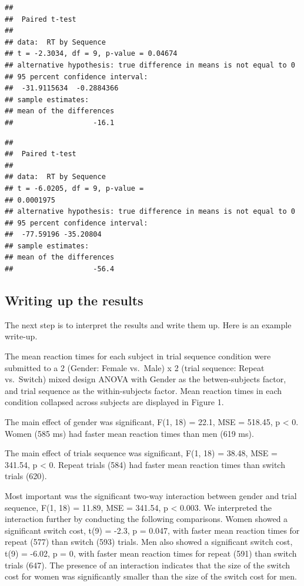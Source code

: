 \begin{verbatim}
## 
##  Paired t-test
## 
## data:  RT by Sequence
## t = -2.3034, df = 9, p-value = 0.04674
## alternative hypothesis: true difference in means is not equal to 0
## 95 percent confidence interval:
##  -31.9115634  -0.2884366
## sample estimates:
## mean of the differences 
##                   -16.1
\end{verbatim}

\begin{Shaded}
\begin{Highlighting}[]
\end{Highlighting}
\end{Shaded}

\begin{verbatim}
## 
##  Paired t-test
## 
## data:  RT by Sequence
## t = -6.0205, df = 9, p-value =
## 0.0001975
## alternative hypothesis: true difference in means is not equal to 0
## 95 percent confidence interval:
##  -77.59196 -35.20804
## sample estimates:
## mean of the differences 
##                   -56.4
\end{verbatim}

\subsection{Writing up the results}\label{writing-up-the-results}

The next step is to interpret the results and write them up. Here is an
example write-up.

The mean reaction times for each subject in trial sequence condition
were submitted to a 2 (Gender: Female vs.~Male) x 2 (trial sequence:
Repeat vs.~Switch) mixed design ANOVA with Gender as the betwen-subjects
factor, and trial sequence as the within-subjects factor. Mean reaction
times in each condition collapsed across subjects are displayed in
Figure 1.

The main effect of gender was significant, F(1, 18) = 22.1, MSE =
518.45, p \textless{} 0. Women (585 ms) had faster mean reaction times
than men (619 ms).

The main effect of trials sequence was significant, F(1, 18) = 38.48,
MSE = 341.54, p \textless{} 0. Repeat trials (584) had faster mean
reaction times than switch trials (620).

Most important was the significant two-way interaction between gender
and trial sequence, F(1, 18) = 11.89, MSE = 341.54, p \textless{} 0.003.
We interpreted the interaction further by conducting the following
comparisons. Women showed a significant switch cost, t(9) = -2.3, p =
0.047, with faster mean reaction times for repeat (577) than switch
(593) trials. Men also showed a significant switch cost, t(9) = -6.02, p
= 0, with faster mean reaction times for repeat (591) than switch trials
(647). The presence of an interaction indicates that the size of the
switch cost for women was significantly smaller than the size of the
switch cost for men.

